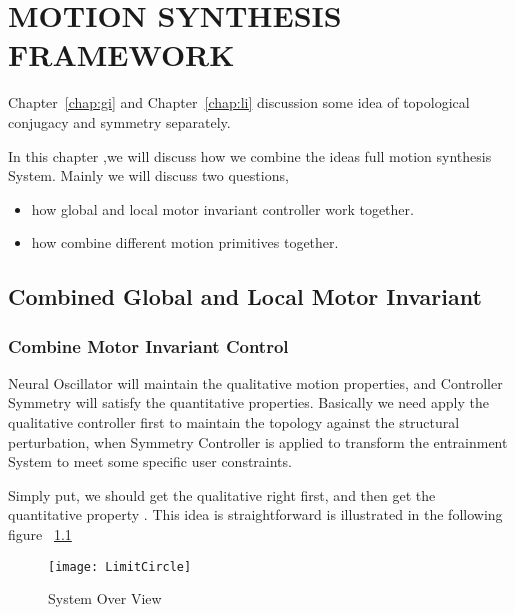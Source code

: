 \chapter {MOTION SYNTHESIS FRAMEWORK}
\label{chap:msf}
\ifpdf
    \graphicspath{{CombineFramework/CombineFrameworkFigs/PNG/}{CombineFramework/CombineFrameworkFigs/PDF/}{CombineFramework/CombineFrameworkFigs/}}
\else
    \graphicspath{{CombineFramework/CombineFrameworkFigs/EPS/}{CombineFramework/CombineFrameworkFigs/}}
\fi

Chapter~\ref{chap:gi}  and Chapter~\ref{chap:li} discussion some idea of topological conjugacy and symmetry separately.

In this chapter ,we will discuss how we combine the ideas full motion synthesis System.
Mainly we will discuss two questions,
\begin{itemize}
\item how global and local motor invariant controller work together.
\item how combine different motion primitives together.
\end{itemize}

\section{Combined Global and Local Motor Invariant}

\subsection{ Combine Motor Invariant Control}

Neural Oscillator will maintain the qualitative motion properties, and Controller Symmetry will satisfy the quantitative properties.
Basically we need apply the qualitative controller first to maintain the topology against the structural perturbation, 
when Symmetry Controller is applied to transform the entrainment System to meet some specific user constraints.


Simply put, we should get the qualitative right first, and then get the quantitative property .
This idea is straightforward is illustrated in the following figure ~\ref{fig:sysoverview}

\begin{figure}[!htbp]
  \begin{center}
      \texttt{[image: LimitCircle]}
    \caption{System Over View }
    \label{fig:sysoverview}
  \end{center}
\end{figure}

